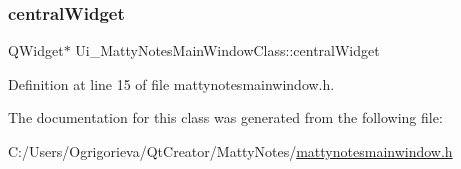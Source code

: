 \subsubsection{\texorpdfstring{central\+Widget}{centralWidget}}
{\footnotesize\ttfamily Q\+Widget$\ast$ Ui\+\_\+\+Matty\+Notes\+Main\+Window\+Class\+::central\+Widget}



Definition at line 15 of file mattynotesmainwindow.\+h.



The documentation for this class was generated from the following file\+:\begin{DoxyCompactItemize}
\item 
C\+:/\+Users/\+Ogrigorieva/\+Qt\+Creator/\+Matty\+Notes/\hyperlink{mattynotesmainwindow_8h}{mattynotesmainwindow.\+h}\end{DoxyCompactItemize}
